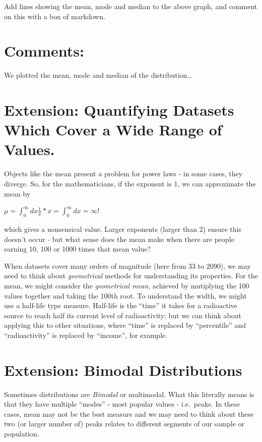 \documentclass[
  letterpaper,
  DIV=11,
  numbers=noendperiod]{scrreprt}
\begin{document}
Add lines showing the mean, mode and median to the above graph, and
comment on this with a box of markdown.

\hypertarget{comments}{%
\section{Comments:}\label{comments}}

We plotted the mean, mode and median of the distribution\ldots{}

\hypertarget{extension-quantifying-datasets-which-cover-a-wide-range-of-values.}{%
\section{Extension: Quantifying Datasets Which Cover a Wide Range of
Values.}\label{extension-quantifying-datasets-which-cover-a-wide-range-of-values.}}

Objects like the mean present a problem for power laws - in some cases,
they diverge. So, for the mathematicians, if the exponent is 1, we can
approximate the mean by

\(\mu = \int_0^{\infty}dx \frac{1}{x}*x = \int_0^{\infty}dx = \infty\)!

which gives a nonsensical value. Larger exponents (larger than 2) ensure
this doesn't occur - but what sense does the mean make when there are
people earning 10, 100 or 1000 times that mean value?

When datasets cover many orders of magnitude (here from 33 to 2090), we
may need to think about \emph{geometrical} methods for understanding its
properties. For the mean, we might consider the \emph{geometrical mean},
achieved by mutiplying the 100 values together and taking the 100th
root. To understand the width, we might use a half-life type measure.
Half-life is the ``time'' it takes for a radioactive source to reach
half its current level of radioactivity; but we can think about applying
this to other situations, where ``time'' is replaced by ``percentile''
and ``radioactivity'' is replaced by ``income'', for example.

\hypertarget{extension-bimodal-distributions}{%
\section{Extension: Bimodal
Distributions}\label{extension-bimodal-distributions}}

Sometimes distributions are \emph{Bimodal} or multimodal. What this
literally means is that they have multiple ``modes'' - most popular
values - i.e.~peaks. In these cases, mean may not be the best measure
and we may need to think about these two (or larger number of) peaks
relates to different segments of our sample or population.
\end{document}
